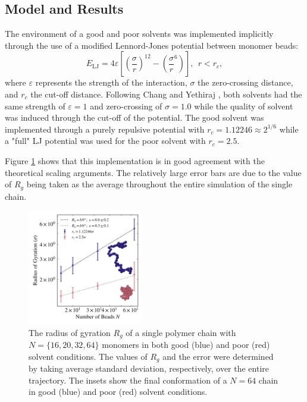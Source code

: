 \documentclass[10pt,a4paper]{labreport}
\begin{document}
\subsection{Model and Results}
The environment of a good and poor solvents was implemented implicitly through the use of a modified Lennord-Jones potential between monomer beads:
\begin{equation}
  E_\text{LJ} = 4 \varepsilon \left[\left(\frac{\sigma}{r}\right)^{12} - \left(\frac{\sigma}{r}^{6}\right)\right], ~~ r < r_c,
\end{equation}
where $\varepsilon$ represents the strength of the interaction, $\sigma$ the zero-crossing distance, and $r_c$ the cut-off distance. 
Following Chang and Yethiraj \cite{}, both solvents had the same strength of $\varepsilon = 1$ and zero-crossing of $\sigma = 1.0$ while the quality of solvent was induced through the cut-off of the potential. 
The good solvent was implemented through a purely repulsive potential with $r_c = 1.12246 \approx 2 ^{1/6}$ while a "full" LJ potential was used for the poor solvent with $r_c =  2.5$. 

Figure \ref{fig:ass2_rgs} shows that this implementation is in good agreement with the theoretical scaling arguments. The relatively large error bars are due to the value of $R_g$ being taken as the average throughout the entire simulation of the single chain. 
\begin{figure}[h]
  \centering 
  \includegraphics[width = 0.45\textwidth]{figs/ass2_rgs.png}
  \caption{The radius of gyration $R_g$ of a single polymer chain with $N = \{16, 20, 32, 64\}$ monomers in both good (blue) and poor (red) solvent conditions. The values of $R_g$ and the error were determined by taking average standard deviation, respectively, over the entire trajectory. The insets show the final conformation of a $N=64$ chain in good (blue) and poor (red) solvent conditions. }
  \label{fig:ass2_rgs}
\end{figure}
\end{document}

